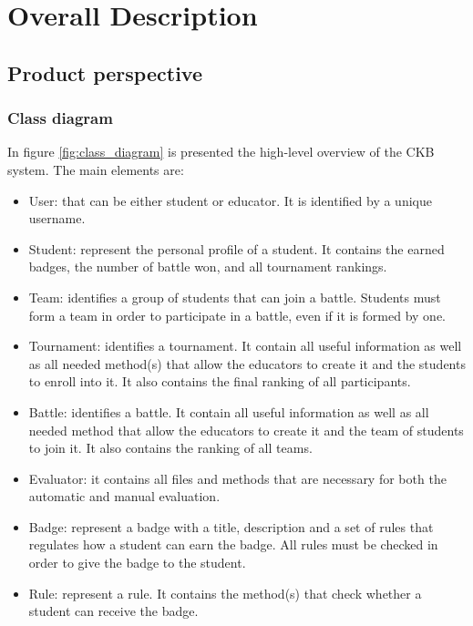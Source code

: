 \chapter{Overall Description}

\section{Product perspective}
\subsection{Class diagram}
In figure \ref{fig:class_diagram} is presented the high-level overview of the CKB system. \newline
The main elements are:
\begin{itemize}
    \item User: that can be either student or educator. It is identified by a unique username.
    \item Student: represent the personal profile of a student. It contains the earned badges, the number of battle won, and all tournament rankings.
    \item Team: identifies a group of students that can join a battle. Students must form a team in order to participate in a battle, even if it is formed by one.
    \item Tournament: identifies a tournament. It contain all useful information as well as all needed method(s) that allow the educators to create it and the students to enroll into it. It also contains the final ranking of all participants.
    \item Battle: identifies a battle. It contain all useful information as well as all needed method that allow the educators to create it and the team of students to join it. It also contains the ranking of all teams.
    \item Evaluator: it contains all files and methods that are necessary for both the automatic and manual evaluation.
    \item Badge: represent a badge with a title, description and a set of rules that regulates how a student can earn the badge. All rules must be checked in order to give the badge to the student.
    \item Rule: represent a rule. It contains the method(s) that check whether a student can receive the badge.
\end{itemize}


